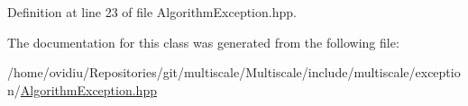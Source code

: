\-Definition at line 23 of file \-Algorithm\-Exception.\-hpp.



\-The documentation for this class was generated from the following file\-:\begin{DoxyCompactItemize}
\item 
/home/ovidiu/\-Repositories/git/multiscale/\-Multiscale/include/multiscale/exception/\hyperlink{AlgorithmException_8hpp}{\-Algorithm\-Exception.\-hpp}\end{DoxyCompactItemize}

